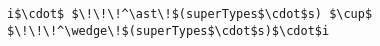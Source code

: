\lstset{frame=tb, aboveskip=12pt, belowskip=-3pt, breaklines=true, basicstyle=\small\ttfamily, tabsize=2, mathescape=true}
\begin{lstlisting}[caption={inference\_help.als, lines 109-109}, label=alloy:overlap, captionpos=b]
i$\cdot$ $\!\!\!^\ast\!$(superTypes$\cdot$s) $\cup$   $\!\!\!^\wedge\!$(superTypes$\cdot$s)$\cdot$i
\end{lstlisting}